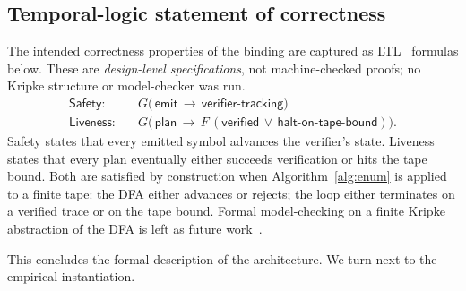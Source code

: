 \subsection{Temporal-logic statement of correctness}

The intended correctness properties of the binding are captured as
LTL~\cite{pnueli1977temporal} formulas below.  These are
\emph{design-level specifications}, not machine-checked proofs;
no Kripke structure or model-checker was run.
\begin{align*}
\textsf{Safety:}\quad &
G\bigl(\,\mathsf{emit}\,\to\,\mathsf{verifier\text{-}tracking}\bigr) \\
\textsf{Liveness:}\quad &
G\bigl(\,\mathsf{plan}\,\to\,F\,(\mathsf{verified}\,\vee\,
\mathsf{halt\text{-}on\text{-}tape\text{-}bound})\bigr).
\end{align*}
Safety states that every emitted symbol advances the verifier's
state.  Liveness states that every plan eventually either succeeds
verification or hits the tape bound.  Both are satisfied by
construction when Algorithm~\ref{alg:enum} is applied to a
finite tape: the DFA either advances or rejects; the loop either
terminates on a verified trace or on the tape bound.  Formal
model-checking on a finite Kripke abstraction of the DFA is
left as future work~\cite{clarke1981ctl,clarke1999modelchecking}.

This concludes the formal description of the architecture.  We
turn next to the empirical instantiation.
